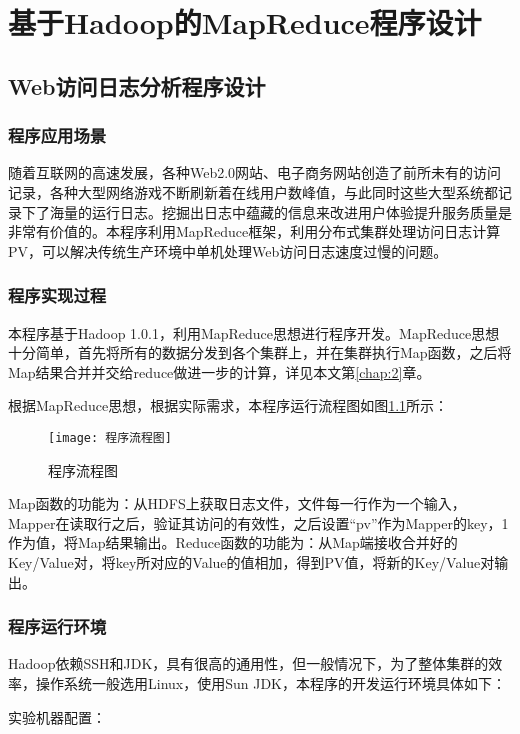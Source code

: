 \chapter{基于Hadoop的MapReduce程序设计}
\label{chap:3}

\section{Web访问日志分析程序设计}
\subsection{程序应用场景}
随着互联网的高速发展，各种Web2.0网站、电子商务网站创造了前所未有的访问记录，各种大型网络游戏不断刷新着在线用户数峰值，与此同时这些大型系统都记录下了海量的运行日志。挖掘出日志中蕴藏的信息来改进用户体验提升服务质量是非常有价值的。本程序利用MapReduce框架，利用分布式集群处理访问日志计算PV，可以解决传统生产环境中单机处理Web访问日志速度过慢的问题。

\subsection{程序实现过程}
本程序基于Hadoop 1.0.1，利用MapReduce思想进行程序开发。MapReduce思想十分简单，首先将所有的数据分发到各个集群上，并在集群执行Map函数，之后将Map结果合并并交给reduce做进一步的计算，详见本文第\ref{chap:2}章。

根据MapReduce思想，根据实际需求，本程序运行流程图如图\ref{fig:程序流程图}所示：

\begin{figure}[h]
 \centering
 \texttt{[image: 程序流程图]}
 \caption{程序流程图}
 \label{fig:程序流程图}
\end{figure}

Map函数的功能为：从HDFS上获取日志文件，文件每一行作为一个输入，Mapper在读取行之后，验证其访问的有效性，之后设置“pv”作为Mapper的key，1作为值，将Map结果输出。Reduce函数的功能为：从Map端接收合并好的Key/Value对，将key所对应的Value的值相加，得到PV值，将新的Key/Value对输出。



\subsection{程序运行环境}
Hadoop依赖SSH和JDK，具有很高的通用性，但一般情况下，为了整体集群的效率，操作系统一般选用Linux，使用Sun JDK，本程序的开发运行环境具体如下：

实验机器配置：

